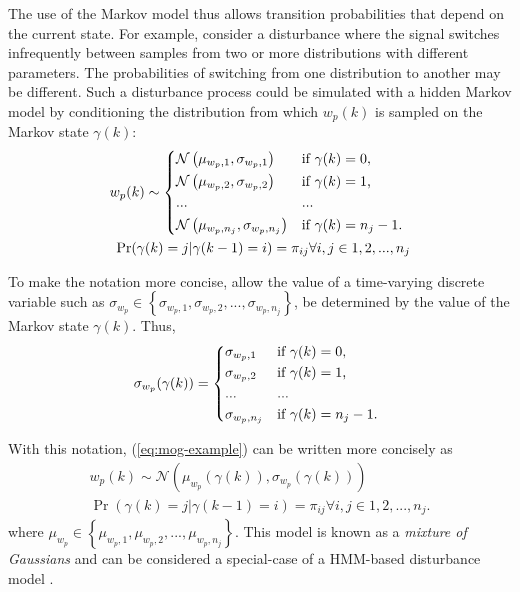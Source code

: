 The use of the Markov model thus allows transition probabilities that depend on the current state. For example, consider a disturbance where the signal switches infrequently between samples from two or more distributions with different parameters. The probabilities of switching from one distribution to another may be different. Such a disturbance process could be simulated with a hidden Markov model by conditioning the distribution from which $w_p(k)$ is sampled on the Markov state $\gamma(k)$:
\begin{equation} \label{eq:mog-example}
	\begin{split}
		w_p(k) \sim 
		\begin{cases*}
			\mathcal{N}\left(\mu_{w_p,1}, \sigma_{w_p,1}\right) & if $\gamma(k)=0$, \\
			\mathcal{N}\left(\mu_{w_p,2}, \sigma_{w_p,2}\right) & if $\gamma(k)=1$, \\
			... & ...\\
			\mathcal{N}\left(\mu_{w_p,n_j}, \sigma_{w_p,n_j}\right) & if $\gamma(k)=n_j-1$.
		\end{cases*} \\
	\Pr(\gamma(k)=j|\gamma(k-1)=i)=\pi_{ij} \forall i,j \in {1,2,...,n_j}
	\end{split}
\end{equation}

To make the notation more concise, allow the value of a time-varying discrete variable such as $\sigma_{w_p} \in \left\{\sigma_{w_p,1}, \sigma_{w_p,2},..., \sigma_{w_p,n_j}\right\}$, be determined by the value of the Markov state $\gamma(k)$. Thus,
\begin{equation} \label{eq:A-selection}
	\sigma_{w_p}(\gamma(k)) = 
	\begin{cases*}
		\sigma_{w_p,1} & if $\gamma(k)=0$, \\
		\sigma_{w_p,2} & if $\gamma(k)=1$, \\
		... & ...\\
		\sigma_{w_p,n_j} & if $\gamma(k)=n_j-1$.
	\end{cases*}
\end{equation}


With this notation, (\ref{eq:mog-example}) can be written more concisely as
\begin{equation} \label{eq:mog-example2}
	\begin{split}
		w_p(k) \sim \mathcal{N}\left(\mu_{w_p}(\gamma(k)), \sigma_{w_p}(\gamma(k))\right) \\
		\Pr(\gamma(k)=j|\gamma(k-1)=i)=\pi_{ij} \forall i,j \in {1,2,...,n_j}.
	\end{split}
\end{equation}
where $\mu_{w_p}\in\left\{\mu_{w_p,1},\mu_{w_p,2},...,\mu_{w_p,n_j}\right\}$. This model is known as a \textit{mixture of Gaussians} and can be considered a special-case of a HMM-based disturbance model \citep{wong_disturbance_2007}.

